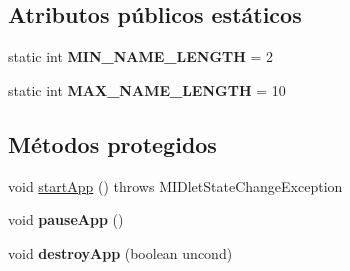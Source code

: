 \subsection*{Atributos públicos estáticos}
\begin{DoxyCompactItemize}
\item 
\hypertarget{classBatallaEspacial_1_1BatallaEspacial_a018ab385fb3845c5651cf31f3fba5ac4}{
static int {\bfseries MIN\_\-NAME\_\-LENGTH} = 2}
\label{classBatallaEspacial_1_1BatallaEspacial_a018ab385fb3845c5651cf31f3fba5ac4}

\item 
\hypertarget{classBatallaEspacial_1_1BatallaEspacial_a8efbca0096841d092e9a46e8668f238d}{
static int {\bfseries MAX\_\-NAME\_\-LENGTH} = 10}
\label{classBatallaEspacial_1_1BatallaEspacial_a8efbca0096841d092e9a46e8668f238d}

\end{DoxyCompactItemize}
\subsection*{Métodos protegidos}
\begin{DoxyCompactItemize}
\item 
void \hyperlink{classBatallaEspacial_1_1BatallaEspacial_a3e9f5462285b858dc120519feaa3b10e}{startApp} ()  throws MIDletStateChangeException 
\item 
\hypertarget{classBatallaEspacial_1_1BatallaEspacial_ad6a63d9e56178a3123bfe30c333a01a4}{
void {\bfseries pauseApp} ()}
\label{classBatallaEspacial_1_1BatallaEspacial_ad6a63d9e56178a3123bfe30c333a01a4}

\item 
\hypertarget{classBatallaEspacial_1_1BatallaEspacial_a1452faa7c9c9440c9b0e92e752b10130}{
void {\bfseries destroyApp} (boolean uncond)}
\label{classBatallaEspacial_1_1BatallaEspacial_a1452faa7c9c9440c9b0e92e752b10130}

\end{DoxyCompactItemize}
